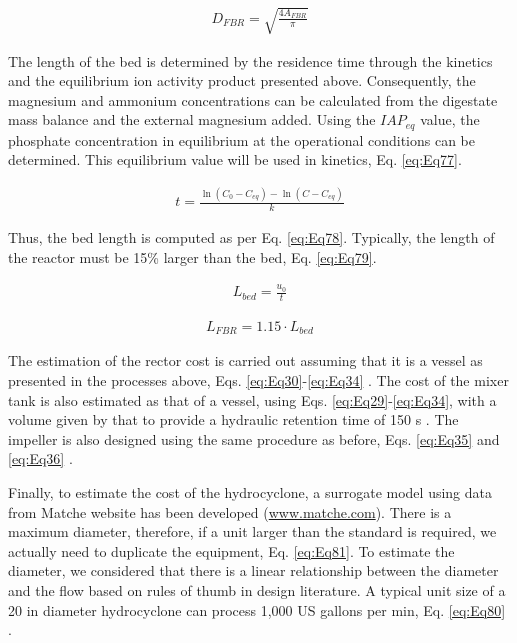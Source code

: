 \begin{refsection}[referencesCh2]
\begin{align}
	{D_{FBR}} = \sqrt {\frac{4{A_{FBR}}}{\pi}} \label{eq:Eq76}
\end{align}

The length of the bed is determined by the residence time through the kinetics and the equilibrium ion activity product presented above. Consequently, the magnesium and ammonium concentrations can be calculated from the digestate mass balance and the external magnesium added. Using the $IAP_{eq}$ value, the phosphate concentration in equilibrium at the operational conditions can be determined. This equilibrium value will be used in kinetics, Eq. \ref{eq:Eq77}.

\begin{align}
	t = \frac{\ln \left( {C_0} - {C_{eq}} \right) - \ln \left( C - {C_{eq}} \right)}{k} \label{eq:Eq77}
\end{align}

Thus, the bed length is computed as per Eq. \ref{eq:Eq78}. Typically, the length of the reactor must be 15\% larger than the bed, Eq. \ref{eq:Eq79}.

\begin{align}
	L_{bed} = \frac{u_0}{t} \label{eq:Eq78}
\end{align}

\begin{align}
	L_{FBR} = 1.15 \cdot L_{bed} \label{eq:Eq79}
\end{align}

The estimation of the rector cost is carried out assuming that it is a vessel as presented in the processes above, Eqs. \ref{eq:Eq30}-\ref{eq:Eq34} \citep{almena2016technoeconomic}. The cost of the mixer tank is also estimated as that of a vessel, using Eqs. \ref{eq:Eq29}-\ref{eq:Eq34}, with a volume given by that to provide a hydraulic retention time of 150 s \citep{szabo2008significance}. The impeller is also designed using the same procedure as before, Eqs. \ref{eq:Eq35} and \ref{eq:Eq36} \citep{walas1988chemical}.

Finally, to estimate the cost of the hydrocyclone, a surrogate model using data from Matche website has been developed \citep{Matche} (\url{www.matche.com}). There is a maximum diameter, therefore, if a unit larger than the standard is required, we actually need to duplicate the equipment, Eq. \ref{eq:Eq81}. To estimate the diameter, we considered that there is a linear relationship between the diameter and the flow based on rules of thumb in design literature. A typical unit size of a 20 in diameter hydrocyclone can process 1,000 US gallons per min, Eq. \ref{eq:Eq80} \citep{walas1988chemical}.


\end{refsection}
